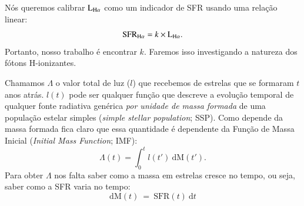Nós queremos calibrar $\LHalpha$ como um indicador de SFR usando uma relação linear:
\begin{equation}
	\mathrm{SFR}_{\Ha} = k \times \LHalpha.
	\label{eq:SFRHa}
\end{equation}
\noindent Portanto, nosso trabalho é encontrar $k$. Faremos isso investigando a natureza dos
fótons H-ionizantes.

Chamamos $\Lambda$ o valor total de luz ($l$) que recebemos de estrelas que se formaram $t$ anos atrás. $l(t)$ pode ser qualquer função que descreve a evolução temporal de qualquer fonte radiativa genérica \emph{por unidade de massa formada} de uma população estelar simples ({\em simple stellar population}; SSP). Como depende da massa formada fica claro que essa quantidade é dependente da Função de Massa Inicial ({\em Initial Mass Function}; IMF):
\begin{equation}
	\Lambda(t) = \int_0^t l(t')\ \textrm{d}\textrm{M}(t').
	\label{eq:dLambda}
\end{equation}
\noindent Para obter $\Lambda$ nos falta saber como a massa em estrelas cresce no tempo, ou seja, saber como a SFR varia no tempo:
\begin{equation}
	\mathrm{d}\mathrm{M}(t)\ =\ \mathrm{SFR}(t)\ \mathrm{d}t
	\label{eq:dM_t}
\end{equation}

